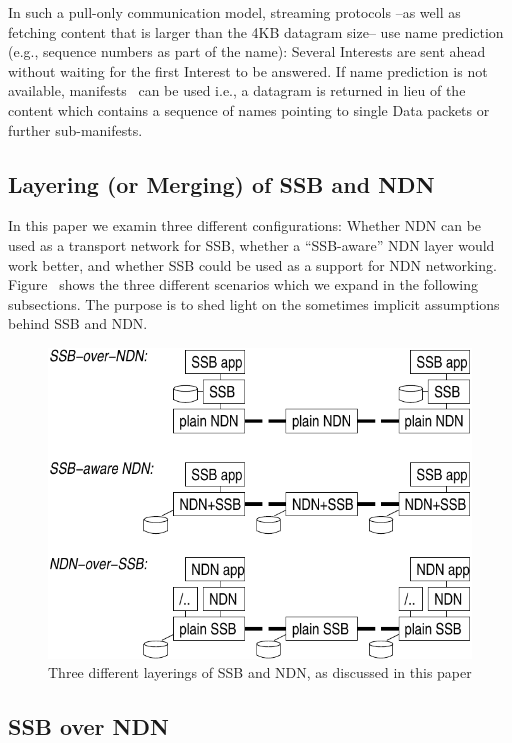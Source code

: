 \documentclass[10pt,sigconf]{acmart}
\begin{document}
In such a pull-only communication model, streaming protocols --as well
as fetching content that is larger than the 4KB datagram size-- use
name prediction (e.g., sequence numbers as part of the name): Several
Interests are sent ahead without waiting for the first Interest to be
answered. If name prediction is not available,
manifests~\cite{manifest} can be used i.e., a datagram is returned in
lieu of the content which contains a sequence of names pointing to
single Data packets or further sub-manifests.

\subsection{Layering (or Merging) of SSB and NDN}

In this paper we examin three different configurations: Whether NDN
can be used as a transport network for SSB, whether a ``SSB-aware''
NDN layer would work better, and whether SSB could be used as a
support for NDN networking. Figure~\cite{fig:ssb-and-ndn} shows the
three different scenarios which we expand in the following
subsections. The purpose is to shed light on the sometimes implicit
assumptions behind SSB and NDN.

\begin{figure}[htb]
  \raggedright
  \includegraphics[width=0.9\columnwidth]{figs/ssb-and-ndn.pdf}
  \caption{\label{fig:ssb-and-ndn}Three different layerings of SSB and NDN,
    as discussed in this paper}
\end{figure}

\subsection{SSB over NDN}
\label{ssect:ssb-over-ndn}
\end{document}
